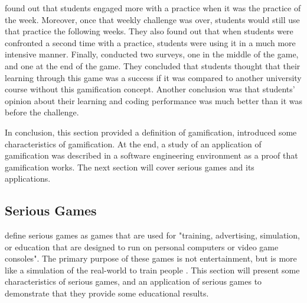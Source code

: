 \documentclass{l4proj}
\begin{document}
\citet{akpolat_enhancing_2014} found out that students engaged more with a practice when it was the practice of the week. Moreover, once that weekly challenge was over, 
students would still use that practice the following weeks. They also found out that when students were confronted a second time with a practice, 
students were using it in a much more intensive manner. Finally, \citet{akpolat_enhancing_2014} conducted two surveys, one in the middle of the game, and one at the end of the game.
They concluded that students thought that their learning through this game was a success if it was compared to another university course without this gamification concept.
Another conclusion was that students' opinion about their learning and coding performance was much better than it was before the challenge.

In conclusion, this section provided a definition of gamification, introduced some characteristics of gamification. 
At the end, a study of an application of gamification was described in a software engineering environment as a proof that gamification works.
The next section will cover serious games and its applications.

\subsection{Serious Games}

\citet{susi_serious_2007} define serious games as games that are used for "training, advertising, simulation, or education that are designed to run
on personal computers or video game consoles". The primary purpose of these games is not entertainment, but is more like a simulation of the real-world
to train people \citep{susi_serious_2007}. This section will present some characteristics of serious games, 
and an application of serious games to demonstrate that they provide some educational results.
\end{document}
